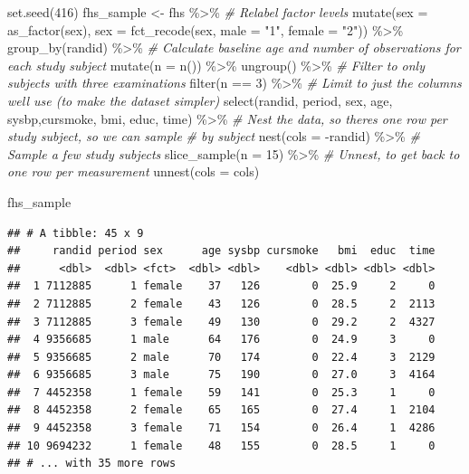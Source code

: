 \documentclass[
]{book}
\newenvironment{Shaded}{\begin{snugshade}}{\end{snugshade}}
\newcommand{\AttributeTok}[1]{\textcolor[rgb]{0.77,0.63,0.00}{#1}}
\newcommand{\CommentTok}[1]{\textcolor[rgb]{0.56,0.35,0.01}{\textit{#1}}}
\newcommand{\DecValTok}[1]{\textcolor[rgb]{0.00,0.00,0.81}{#1}}
\newcommand{\FunctionTok}[1]{\textcolor[rgb]{0.00,0.00,0.00}{#1}}
\newcommand{\NormalTok}[1]{#1}
\newcommand{\OtherTok}[1]{\textcolor[rgb]{0.56,0.35,0.01}{#1}}
\newcommand{\SpecialCharTok}[1]{\textcolor[rgb]{0.00,0.00,0.00}{#1}}
\newcommand{\StringTok}[1]{\textcolor[rgb]{0.31,0.60,0.02}{#1}}
\begin{document}
\begin{Shaded}
\begin{Highlighting}[]
\FunctionTok{set.seed}\NormalTok{(}\DecValTok{416}\NormalTok{)}
\NormalTok{fhs\_sample }\OtherTok{\textless{}{-}}\NormalTok{ fhs }\SpecialCharTok{\%\textgreater{}\%} 
  \CommentTok{\# Relabel factor levels}
  \FunctionTok{mutate}\NormalTok{(}\AttributeTok{sex =} \FunctionTok{as\_factor}\NormalTok{(sex),}
         \AttributeTok{sex =} \FunctionTok{fct\_recode}\NormalTok{(sex, }
                          \AttributeTok{male =} \StringTok{"1"}\NormalTok{, }
                          \AttributeTok{female =} \StringTok{"2"}\NormalTok{)) }\SpecialCharTok{\%\textgreater{}\%} 
  \FunctionTok{group\_by}\NormalTok{(randid) }\SpecialCharTok{\%\textgreater{}\%} 
  \CommentTok{\# Calculate baseline age and number of observations for each study subject}
  \FunctionTok{mutate}\NormalTok{(}\AttributeTok{n =} \FunctionTok{n}\NormalTok{()) }\SpecialCharTok{\%\textgreater{}\%} 
  \FunctionTok{ungroup}\NormalTok{() }\SpecialCharTok{\%\textgreater{}\%} 
  \CommentTok{\# Filter to only subjects with three examinations}
  \FunctionTok{filter}\NormalTok{(n }\SpecialCharTok{==} \DecValTok{3}\NormalTok{) }\SpecialCharTok{\%\textgreater{}\%} 
  \CommentTok{\# Limit to just the columns we\textquotesingle{}ll use (to make the dataset simpler)}
  \FunctionTok{select}\NormalTok{(randid, period, sex, age, sysbp,cursmoke, bmi, educ, time) }\SpecialCharTok{\%\textgreater{}\%} 
  \CommentTok{\# Nest the data, so there\textquotesingle{}s one row per study subject, so we can sample }
  \CommentTok{\# by subject}
  \FunctionTok{nest}\NormalTok{(}\AttributeTok{cols =} \SpecialCharTok{{-}}\NormalTok{randid) }\SpecialCharTok{\%\textgreater{}\%} 
  \CommentTok{\# Sample a few study subjects}
  \FunctionTok{slice\_sample}\NormalTok{(}\AttributeTok{n =} \DecValTok{15}\NormalTok{) }\SpecialCharTok{\%\textgreater{}\%} 
  \CommentTok{\# Unnest, to get back to one row per measurement}
  \FunctionTok{unnest}\NormalTok{(}\AttributeTok{cols =}\NormalTok{ cols)}

\NormalTok{fhs\_sample}
\end{Highlighting}
\end{Shaded}

\begin{verbatim}
## # A tibble: 45 x 9
##     randid period sex      age sysbp cursmoke   bmi  educ  time
##      <dbl>  <dbl> <fct>  <dbl> <dbl>    <dbl> <dbl> <dbl> <dbl>
##  1 7112885      1 female    37   126        0  25.9     2     0
##  2 7112885      2 female    43   126        0  28.5     2  2113
##  3 7112885      3 female    49   130        0  29.2     2  4327
##  4 9356685      1 male      64   176        0  24.9     3     0
##  5 9356685      2 male      70   174        0  22.4     3  2129
##  6 9356685      3 male      75   190        0  27.0     3  4164
##  7 4452358      1 female    59   141        0  25.3     1     0
##  8 4452358      2 female    65   165        0  27.4     1  2104
##  9 4452358      3 female    71   154        0  26.4     1  4286
## 10 9694232      1 female    48   155        0  28.5     1     0
## # ... with 35 more rows
\end{verbatim}
\end{document}

